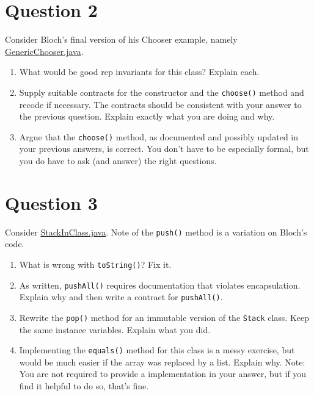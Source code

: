 \documentclass[10pt]{article}
\begin{document}
\section{Question 2}

Consider Bloch's final version of his Chooser example, namely  \href{https://nguyenthanhvuh.github.io/class-oo/files/GenericChooser.java}{GenericChooser.java}.


\begin{enumerate}
\item
What would be good rep invariants for this class?  Explain each. %
\item
Supply suitable contracts for the constructor and the {\tt choose()} method
and recode if necessary.
The contracts should be consistent with your answer to the previous question.
Explain exactly what you are doing and why.
\item
Argue that the {\tt choose()} method, as documented and possibly updated
in your previous answers, is correct.  
You don't have to be especially formal, but you do have
to ask (and answer) the right questions.  
\end{enumerate}

\newpage
\section{Question 3}

Consider \href{https://nguyenthanhvuh.github.io/class-oo/files/StackInClass.java}{StackInClass.java}.
Note of the {\tt push()} method is a variation on Bloch's code.

\begin{enumerate}
\item
What is wrong with {\tt toString()}?  Fix it.

\item
As written, {\tt pushAll()} requires documentation that violates encapsulation.  Explain why
and then write a contract for {\tt pushAll()}.

\item
Rewrite the {\tt pop()} method for an immutable version of the {\tt Stack} class.
Keep the same instance variables. Explain what you did.

\item
Implementing the {\tt equals()} method for this class is a messy exercise, but would
	be much easier if the array was replaced by a list.  Explain why.
	Note:  You are not required to provide a implementation in your answer,
	but if you find it helpful to do so, that's fine.
\end{enumerate}
\end{document}
